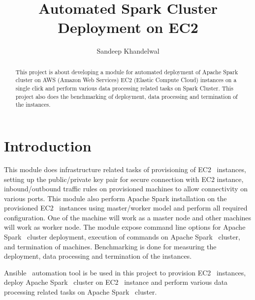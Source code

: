 
\title{Automated Spark Cluster Deployment on EC2}


\author{Sandeep Khandelwal}


\renewcommand{\shortauthors}{Sandeep}


\begin{abstract}

This project is about developing a module for automated deployment of
Apache Spark cluster on AWS (Amazon Web Services) EC2 (Elastic Compute
Cloud) instances on a single click and perform various data processing
related tasks on Spark Cluster. This project also does the
benchmarking of deployment, data processing and termination of the
instances.

\end{abstract}



\maketitle

\section{Introduction}

This module does infrastructure related tasks of provisioning of
EC2~\cite{hid-sp18-511-www-ec2} instances, setting up the
public/private key pair for secure connection with EC2 instance,
inbound/outbound traffic rules on provisioned machines to allow
connectivity on various ports. This module also perform Apache Spark
installation on the provisioned EC2~\cite{hid-sp18-511-www-ec2}
instances using master/worker model and perform all required
configuration. One of the machine will work as a master node and other
machines will work as worker node. The module expose command line
options for Apache Spark~\cite{hid-sp18-511-www-spark} cluster
deployment, execution of commands on Apache
Spark~\cite{hid-sp18-511-www-spark} cluster, and termination of
machines. Benchmarking is done for measuring the deployment, data
processing and termination of the instances.

Ansible~\cite{hid-sp18-511-www-ansible} automation tool is be used in
this project to provision EC2~\cite{hid-sp18-511-www-ec2} instances,
deploy Apache Spark~\cite{hid-sp18-511-www-spark} cluster on
EC2~\cite{hid-sp18-511-www-ec2} instance and perform various data
processing related tasks on Apache Spark~\cite{hid-sp18-511-www-spark}
cluster.

